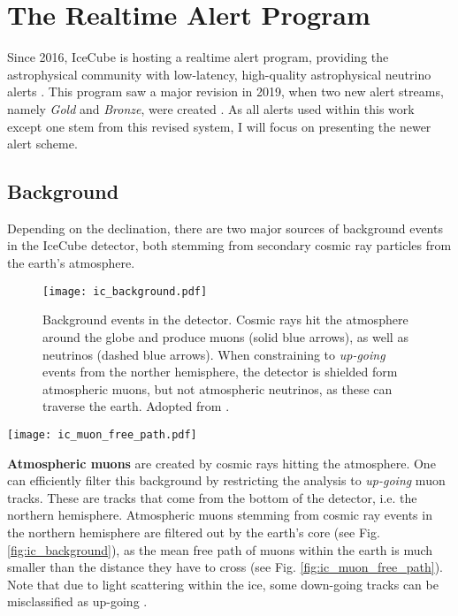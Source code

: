 \section{The Realtime Alert Program}\label{ic_alert_program}
Since 2016, IceCube is hosting a realtime alert program, providing the astrophysical community with low-latency, high-quality astrophysical neutrino alerts \cite{Aartsen2017a}. This program saw a major revision in 2019, when two new alert streams, namely \textit{Gold} and \textit{Bronze}, were created . As all alerts used within this work except one stem from this revised system, I will focus on presenting the newer alert scheme.

\subsection{Background}\label{background}
Depending on the declination, there are two major sources of background events in the IceCube detector, both stemming from secondary cosmic ray particles from the earth's atmosphere.
\begin{figure}[htb]
    \texttt{[image: ic\_background.pdf]}
    \caption[Background events]{Background events in the detector. Cosmic rays hit the atmosphere around the globe and produce muons (solid blue arrows), as well as neutrinos (dashed blue arrows). When constraining to \textit{up-going} events from the norther hemisphere, the detector is shielded form atmospheric muons, but not atmospheric neutrinos, as these can traverse the earth. Adopted from \cite{Ahlers2018a}.}
\end{figure}

\begin{marginfigure}
    \texttt{[image: ic\_muon\_free\_path.pdf]}
    \caption[Muon free path in ice]{Free path length for \SI{1}{\peta\eV} muons in ice. The mean free path in ice is slightly longer than in rock. From \cite{Chirkin2004}.}
\end{marginfigure}

\textbf{Atmospheric muons} are created by cosmic rays hitting the atmosphere. One can efficiently filter this background by restricting the analysis to \textit{up-going} muon tracks. These are tracks that come from the bottom of the detector, i.e. the northern hemisphere. Atmospheric muons stemming from cosmic ray events in the northern hemisphere are filtered out by the earth's core (see Fig. \ref{fig:ic_background}), as the mean free path of muons within the earth is much smaller  than the distance they have to cross (see Fig. \ref{fig:ic_muon_free_path}). Note that due to light scattering within the ice, some down-going tracks can be misclassified as up-going .

